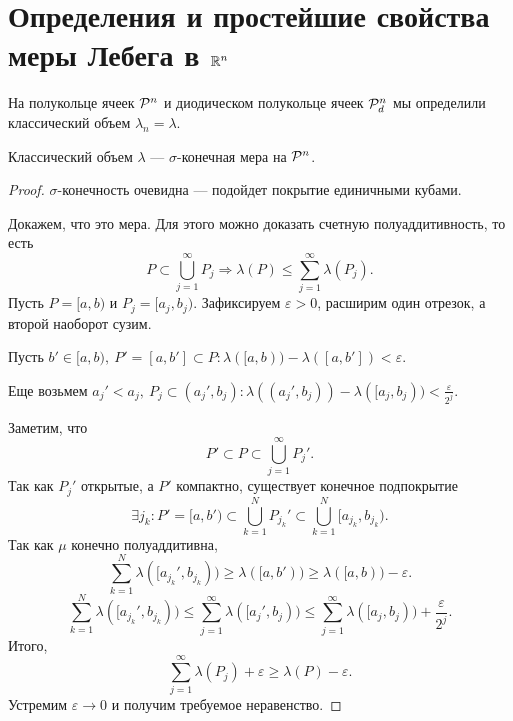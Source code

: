 \section{Определения и простейшие свойства меры Лебега в $ \R^{n}$}
На полукольце ячеек  $ \P^{n}$ и диодическом полукольце ячеек $ \P^{n}_d$ мы определили классический объем $ \lambda _n = \lambda $.
\begin{thm}
    Классический объем  $ \lambda $ --- $ \sigma $-конечная мера на $ \P^{n}$.
\end{thm}
\begin{proof}
    $ \sigma $-конечность очевидна --- подойдет покрытие единичными кубами.

	Докажем, что это мера. Для этого можно доказать счетную полуаддитивность, то есть
	\[
		P \subset \bigcup_{j=1}^{\infty} P_j \Longrightarrow \lambda (P) \le \sum_{j=1}^{\infty} \lambda (P_j)
	.\] 
	Пусть $ P = [a, b)$ и $ P_j = [a_j, b_j)$. Зафиксируем $ \varepsilon >0$, расширим один отрезок, а второй наоборот сузим.

	Пусть $ b' \in [a, b),~ P'=[a, b'] \subset P\colon \lambda ([a, b)) - \lambda ([a, b']) < \varepsilon $. 

	Еще возьмем $ a_j' < a_j,  ~P_j\subset (a_j', b_j)\colon \lambda ((a_j', b_j)) - \lambda ([a_j, b_j)) < \frac{\varepsilon}{2^{j}} $.

	Заметим, что
	\[
	P' \subset P \subset \bigcup_{j=1}^{\infty} P_j'
	.\] 
	Так как $ P_j'$ открытые, а $ P'$ компактно, существует конечное подпокрытие 
	\[
		\exists j_k\colon P' = [a, b')  \subset \bigcup_{k=1}^{N} P_{j_k}' \subset \bigcup_{k=1}^{N} [a_{j_k}, b_{j_k})
	.\] 
	Так как $ \mu$ конечно полуаддитивна,
	\[
		\sum_{k=1}^{N} \lambda ([a_{j_k}', b_{j_k})) \ge \lambda ([a, b')) \ge \lambda ([a, b)) - \varepsilon 
	.\] 
	\[
		\sum_{k=1}^{N} \lambda ([a_{j_k}', b_{j_k})) \le \sum_{j=1}^{\infty} \lambda ([a_j', b_{j})) \le \sum_{j=1}^{\infty} \lambda ([a_j, b_j)) + \frac{\varepsilon}{2^{j}}
	.\] 
	Итого,
	\[
		\sum_{j=1}^{\infty} \lambda (P_j) + \varepsilon  \ge \lambda (P) - \varepsilon 
	.\] 
	Устремим $ \varepsilon \to 0$ и получим требуемое неравенство.
\end{proof}

